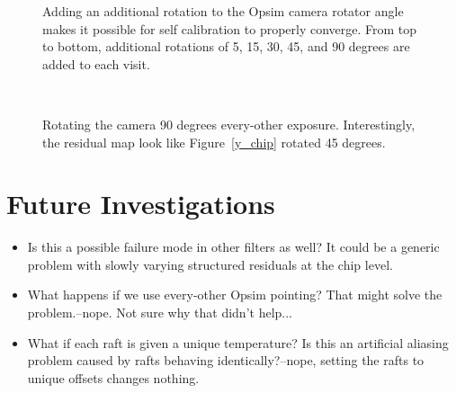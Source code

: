 \begin{figure}
\\
\\
\\
\\
\\
\caption{Adding an additional rotation to the Opsim camera rotator angle makes it possible for self calibration to properly converge.  From top to bottom, additional rotations of  5, 15, 30, 45, and 90 degrees are added to each visit. \label{steprot} }
\end{figure}


\begin{figure}
\\
\caption{Rotating the camera 90 degrees every-other exposure.  Interestingly, the residual map look like Figure~\ref{y_chip} rotated 45 degrees.  \label{90evother}}
\end{figure}


\section{Future Investigations}
\begin{itemize}
\item{Is this a possible failure mode in other filters as well?  It could be a generic problem with slowly varying structured residuals at the chip level.}
\item{What happens if we use every-other Opsim pointing?  That might solve the problem.--nope.  Not sure why that didn't help...}
\item{What if each raft is given a unique temperature?  Is this an artificial aliasing problem caused by rafts behaving identically?--nope, setting the rafts to unique offsets changes nothing.}
\end{itemize}
